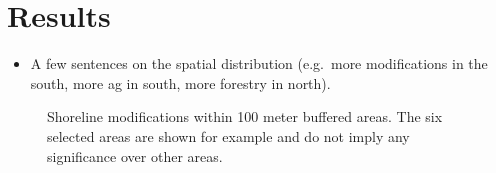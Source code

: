 \documentclass[12pt]{article}\usepackage[]{graphicx}\usepackage[]{color}
\begin{document}
\hypertarget{results}{%
\section{Results}\label{results}}
\begin{itemize}

\item
  A few sentences on the spatial distribution (e.g.~more modifications in the south, more ag in south, more forestry in north).
\end{itemize}
\begin{figure}[H]

{\centering {} 

}

\caption{Shoreline modifications within 100 meter buffered areas. The six selected areas are shown for example and do not imply any significance over other areas.}\label{fig:exampleareas}
\end{figure}
\end{document}

